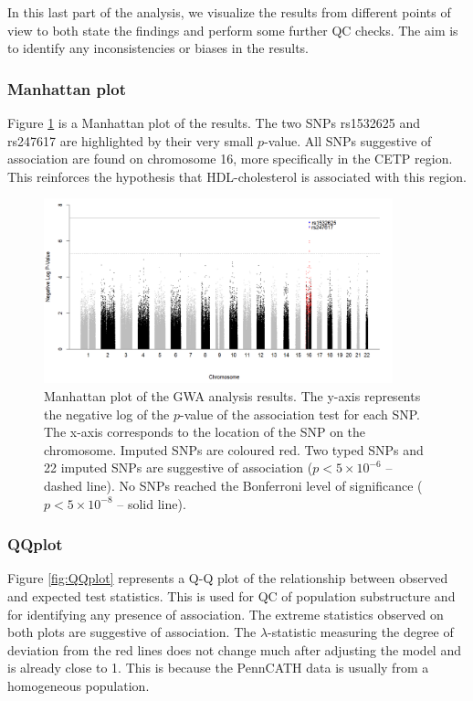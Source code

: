 \documentclass[a4paper, 12pt]{article}
\begin{document}
In this last part of the analysis, we visualize the results from different points of view to both state the findings and perform some further QC checks. The aim is to identify any inconsistencies or biases in the results. 

\subsubsection*{Manhattan plot}

Figure \ref{fig:Manhattan} is a Manhattan plot of the results. The two SNPs rs1532625 and rs247617 are highlighted by their very small $p$-value. All SNPs suggestive of association are found on chromosome 16, more specifically in the CETP region. This reinforces the hypothesis that HDL-cholesterol is associated with this region. 

\begin{figure}[!ht]
\centering
\includegraphics[width=0.9\textwidth]{../Plots/Manhattan.png}
\caption{Manhattan plot of the GWA analysis results. The y-axis represents the negative log of the $p$-value of the association test for each SNP. The x-axis corresponds to the location of the SNP on the chromosome. Imputed SNPs are coloured red. Two typed SNPs and 22 imputed SNPs are suggestive of association ($p < 5 \times 10^{-6}$ -- dashed line). No SNPs reached the Bonferroni level of significance ($p < 5 \times 10^{-8}$ -- solid line).}
\label{fig:Manhattan}
\end{figure}


\subsubsection*{QQplot}

Figure \ref{fig:QQplot} represents a Q-Q plot of the relationship between observed and expected test statistics. This is used for QC of population substructure and for identifying any presence of association. The extreme statistics observed on both plots are suggestive of association. The $\lambda$-statistic measuring the degree of deviation from the red lines does not change much after adjusting the model and is already close to 1. This is because the PennCATH data is usually from a homogeneous population. 
\end{document}
